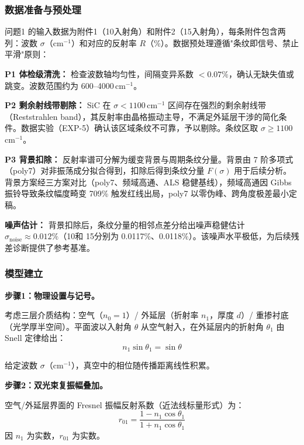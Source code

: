 \subsubsection{数据准备与预处理}

问题1 的输入数据为附件1（10\degree 入射角）和附件2（15\degree 入射角），每条附件包含两列：波数 $\sigma$（cm$^{-1}$）和对应的反射率 $R$（\%）。数据预处理遵循"条纹即信号、禁止平滑"原则：

\textbf{P1 体检级清洗：} 检查波数轴均匀性，间隔变异系数 $<0.07\%$，确认无缺失值或跳变。波数范围约为 600--4000\,cm$^{-1}$。

\textbf{P2 剩余射线带剔除：} SiC 在 $\sigma<1100$\,cm$^{-1}$ 区间存在强烈的剩余射线带（Reststrahlen band），其反射率由晶格振动主导，不满足外延层干涉的简化条件。数据实验（EXP-5）确认该区域条纹不可靠，予以剔除。条纹区取 $\sigma\geq1100$\,cm$^{-1}$。

\textbf{P3 背景扣除：} 反射率谱可分解为缓变背景与周期条纹分量。背景由 7 阶多项式（poly7）对非振荡成分拟合得到，扣除后得到条纹分量 $F(\sigma)$ 用于后续分析。背景方案经三方案对比（poly7、频域高通、ALS 稳健基线），频域高通因 Gibbs 振铃导致条纹幅度畸变 709\% 触发红线出局，poly7 以零伪峰、跨角度极差最小定稿。

\textbf{噪声估计：} 背景扣除后，条纹分量的相邻点差分给出噪声稳健估计 $\hat{\sigma}_{\text{noise}}\approx0.012\%$（10\degree 和 15\degree 分别为 0.0117\%、0.0118\%）。该噪声水平极低，为后续残差诊断提供了参考基准。

\subsubsection{模型建立}

\textbf{步骤1：物理设置与记号。}

考虑三层介质结构：空气（$n_0=1$）/ 外延层（折射率 $n_1$，厚度 $d$）/ 重掺衬底（光学厚半空间）。平面波以入射角 $\theta$ 从空气射入，在外延层内的折射角 $\theta_1$ 由 Snell 定律给出：
\begin{equation}
    n_1\sin\theta_1 = \sin\theta
\end{equation}

给定波数 $\sigma$（cm$^{-1}$），真空中的相位随传播距离线性积累。

\textbf{步骤2：双光束复振幅叠加。}

空气/外延层界面的 Fresnel 振幅反射系数（近法线标量形式）为：
\begin{equation}
    r_{01} = \frac{1 - n_1\cos\theta_1}{1 + n_1\cos\theta_1}
\end{equation}
因 $n_1$ 为实数，$r_{01}$ 为实数。

